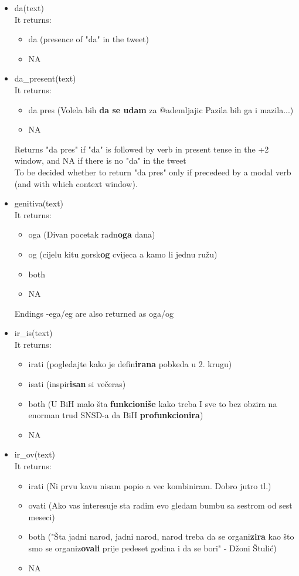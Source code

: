 \documentclass[a4paper]{article}
\begin{document}
\begin{itemize}
\item da(text)\\
It returns:
\begin{itemize}
\item da (presence of "da" in the tweet)
\item NA
\end{itemize}

\item da\_present(text)\\
It returns:
\begin{itemize}
\item da pres (Volela bih \textbf{da se udam} za @ademljajic Pazila bih ga i mazila...)
\item NA
\end{itemize}
Returns "da pres" if "da" is followed by verb in present tense in the +2 window,
      and NA if there is no "da" in the tweet \\
To be decided whether to return "da pres" only if precedeed by a modal verb (and with which context window).

\item genitiva(text)\\
It returns:
\begin{itemize}
\item oga (Divan pocetak radn\textbf{oga} dana)
\item og (\@LadyAnjanas cijelu kitu gorsk\textbf{og} cvijeca a kamo li jednu ružu)
\item both
\item NA 
\end{itemize}
Endings -ega/eg are also returned as oga/og

\item ir\_is(text)\\
It returns:
\begin{itemize}
\item irati (pogledajte kako je defin\textbf{irana} pobkeda u 2. krugu)
\item isati (inspir\textbf{isan} si večeras)
\item both (U BiH malo šta \textbf{funkcioniše} kako treba I sve to bez obzira na enorman trud SNSD-a da BiH \textbf{profunkcionira})
\item NA
\end{itemize}

\item ir\_ov(text)\\
It returns:
\begin{itemize}
\item irati (Ni prvu kavu nisam popio a vec kombiniram. Dobro jutro tl.)
\item ovati (Ako vas interesuje sta radim evo gledam bumbu sa sestrom od sest meseci)
\item both ("Šta jadni narod, jadni narod, narod treba da se organi\textbf{zira} kao što smo se organiz\textbf{ovali} prije pedeset godina i da se bori" - Džoni Štulić)
\item NA
\end{itemize}


\end{itemize}
\end{document}
